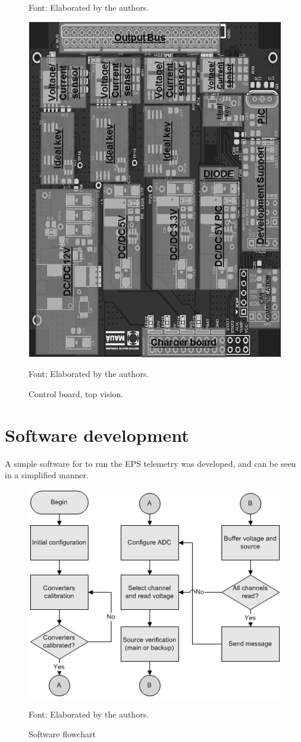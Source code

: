 \documentclass[3p]{elsarticle}
\begin{document}
\begin{figure}[th]
\begin{minipage}[b]{0.3\textwidth}
	    \begin{footnotesize}
		Font: Elaborated by the authors.
		\end{footnotesize}
	  \end{minipage}
	  \hfill
	  \begin{minipage}[b]{0.3\textwidth}
		\label{charger}
		\centering
		\includegraphics[width=0.7\linewidth]{./figs/control}
	    \caption{Control board, top vision.}
	    
	    \begin{footnotesize}
		Font: Elaborated by the authors.
		\end{footnotesize}
	  \end{minipage}
	\end{figure}
	
\section{Software development}
\label{Software development}

	A simple software for to run the EPS telemetry was developed, and can be seen in a simplified manner.
		
	\begin{figure}[th]
		\label{flow}
		\centering
		\includegraphics[width=0.4\linewidth]{./figs/fluxo2}
		\caption{Software flowchart}
		
		\begin{footnotesize}
		Font: Elaborated by the authors.
		\end{footnotesize}
	\end{figure}
\end{document}
